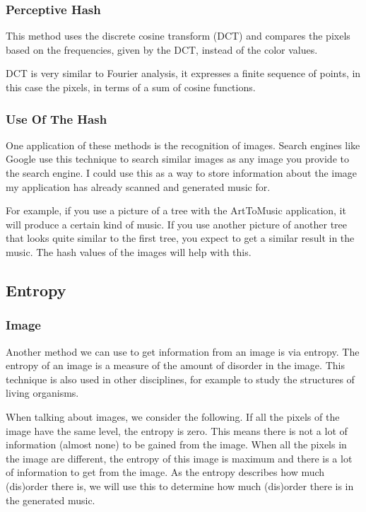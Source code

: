 \documentclass[12pt]{article}
\begin{document}
\subsubsection{Perceptive Hash}
This method uses the discrete cosine transform (DCT) and compares the pixels based on the frequencies, given by the DCT, instead of the color values.

DCT is very similar to Fourier analysis, it expresses a finite sequence of points, in this case the pixels, in terms of a sum of cosine functions.

\subsubsection{Use Of The Hash}
One application of these methods is the recognition of images. Search engines like Google use this technique to search similar images as any image you provide to the search engine. I could use this as a way to store information about the image my application has already scanned and generated music for.
\newline

For example, if you use a picture of a tree with the ArtToMusic application, it will produce a certain kind of music. If you use another picture of another tree that looks quite similar to the first tree, you expect to get a similar result in the music. The hash values of the images will help with this. 

\subsection{Entropy}

\subsubsection{Image}

Another method we can use to get information from an image is via entropy.
The entropy of an image is a measure of the amount of disorder in the image. This technique is also used in other disciplines, for example to study the structures of living organisms.
\newline

When talking about images, we consider the following. If all the pixels of the image have the same level, the entropy is zero. This means there is not a lot of information (almost none) to be gained from the image. When all the pixels in the image are different, the entropy of this image is maximum and there is a lot of information to get from the image.
As the entropy describes how much (dis)order there is, we will use this to determine how much (dis)order there is in the generated music.
\newline
\end{document}
